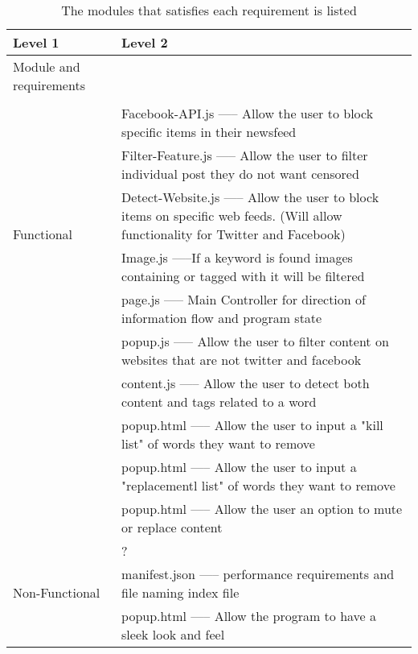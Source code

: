 \documentclass[12pt, titlepage]{article}
\begin{document}
\begin{table}[h!]
\centering
\begin{tabular}{p{} p{}}
\toprule
\textbf{Level 1} & \textbf{Level 2}\\
\midrule
{Module and requirements} & ~ \\
\midrule
\multirow{7}{0.3\textwidth}{Functional}\\
& Facebook-API.js ----- Allow the user to block specific items in their newsfeed\\
&Filter-Feature.js ----- Allow the user to filter individual post they do not want censored\\
&Detect-Website.js ----- Allow the user to block items on specific web feeds. (Will allow functionality for Twitter and Facebook)\\
&Image.js -----If a keyword is found images containing or tagged with it will be filtered\\
& page.js ----- Main Controller for direction of information flow and program state\\
& popup.js ----- Allow the user to filter content on websites that are not twitter and facebook\\
& content.js ----- Allow the user to detect both content and tags related to a word\\
& popup.html ----- Allow the user to input a "kill list" of words they want to remove\\
& popup.html ----- Allow the user to input a "replacementl list" of words they want to remove\\
& popup.html ----- Allow the user an option to mute or replace content\\
\midrule
\multirow{3}{0.3\textwidth}{Non-Functional} & {?}\\
& manifest.json ----- performance requirements and file naming index file\\
& popup.html ----- Allow the program to have a sleek look and feel\\

\bottomrule
\end{tabular}
\caption{The modules that satisfies each requirement is listed}
\label{TblMH}
\end{table}
\end{document}

